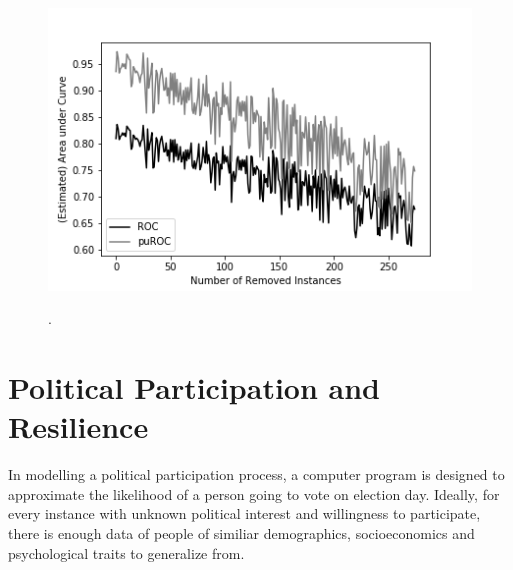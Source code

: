 \begin{figure}[ht]
	\begin{center}
		\includegraphics[scale=0.70,angle=0]{fig/roc_AUC}
		\label{occ}
		\vspace*{-1.0cm}
		\caption{.}
	\end{center}
\end{figure}

\section{Political Participation and Resilience}

In modelling a political participation process, a computer program is designed to approximate the likelihood of a person going to vote on election day. Ideally, for every instance with unknown political interest and willingness to participate, there is enough data of people of similiar demographics, socioeconomics and psychological traits to generalize from. 

